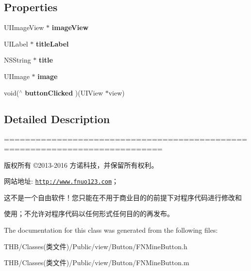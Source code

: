 \subsection*{Properties}
\begin{DoxyCompactItemize}
\item 
\mbox{\label{interface_f_n_mine_button_a593a16abba26450c3d7f995efbc686cc}} 
U\+I\+Image\+View $\ast$ {\bfseries image\+View}
\item 
\mbox{\label{interface_f_n_mine_button_aef764837c3798f121cecb93e125b6f5d}} 
U\+I\+Label $\ast$ {\bfseries title\+Label}
\item 
\mbox{\label{interface_f_n_mine_button_a32ab79bee671181f0123290e98b68974}} 
N\+S\+String $\ast$ {\bfseries title}
\item 
\mbox{\label{interface_f_n_mine_button_a4d3e1e56ff8ae865d2f198013c45cd97}} 
U\+I\+Image $\ast$ {\bfseries image}
\item 
\mbox{\label{interface_f_n_mine_button_a5215b78b0dc017154e0fe4e657749787}} 
void($^\wedge$ {\bfseries button\+Clicked} )(U\+I\+View $\ast$view)
\end{DoxyCompactItemize}


\subsection{Detailed Description}
============================================================================

版权所有 ©2013-\/2016 方诺科技，并保留所有权利。

网站地址\+: \href{http://www.fnuo123.com}{\tt http\+://www.\+fnuo123.\+com}； 



这不是一个自由软件！您只能在不用于商业目的的前提下对程序代码进行修改和

使用；不允许对程序代码以任何形式任何目的的再发布。 

 

The documentation for this class was generated from the following files\+:\begin{DoxyCompactItemize}
\item 
T\+H\+B/\+Classes(类文件)/\+Public/view/\+Button/F\+N\+Mine\+Button.\+h\item 
T\+H\+B/\+Classes(类文件)/\+Public/view/\+Button/F\+N\+Mine\+Button.\+m\end{DoxyCompactItemize}
